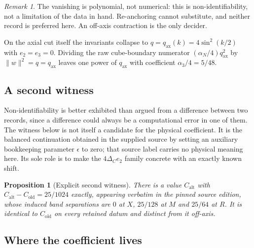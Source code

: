 \documentclass[11pt]{article}
\theoremstyle{plain}
\newtheorem{proposition}[theorem]{Proposition}
\theoremstyle{definition}
\theoremstyle{remark}
\newtheorem{remark}[theorem]{Remark}
\newcommand{\chk}[1]{}
\begin{document}
\begin{remark}
The vanishing is polynomial, not numerical: this is non-identifiability, not a
limitation of the data in hand. Re-anchoring cannot substitute, and neither
record is preferred here. An off-axis contraction is the only decider.
\chk{the crosswalk is exactly scalar on the momentum axes}
\end{remark}

On the axial cut itself the invariants collapse to
$q=q_{\mathrm{ax}}(k)=4\sin^2(k/2)$ with $e_2=e_3=0$. Dividing the raw
cube-boundary numerator $(\alpha_N/4)q_{\mathrm{ax}}^2$ by
$\|w\|^2=q=q_{\mathrm{ax}}$ leaves one power of $q_{\mathrm{ax}}$ with
coefficient $\alpha_3/4=5/48$.
\chk{on an axial cut the mixed invariants vanish and the norm divides}

\subsection{A second witness}

Non-identifiability is better exhibited than argued from a difference between
two records, since a difference could always be a computational error in one of
them. The witness below is not itself a candidate for the physical
coefficient. It is the balanced continuation obtained in the supplied source
by setting an auxiliary bookkeeping parameter $\epsilon$ to zero; that source
label carries no physical meaning here. Its sole role is to make the
$4\Delta_Ce_2$ family concrete with an exactly known shift.

\begin{proposition}[Explicit second witness]\label{prop:witness}
There is a value $C_{\mathrm{alt}}$ with
$C_{\mathrm{alt}}-C_{\mathrm{old}}=25/1024$ exactly, appearing verbatim in the
pinned source edition, whose induced band separations are $0$ at $X$,
$25/128$ at $M$ and $25/64$ at $R$. It is identical to
$C_{\mathrm{old}}$ on every retained datum and distinct from it off-axis.
\end{proposition}
\chk{FINDING: an explicit second witness C\_alt exhibits the C2 non-identifiability}
\chk{the C\_alt witness IS the balanced eps-free continuation, and Delta\_C/(A/2) = 15/32}

\subsection{Where the coefficient lives}
\end{document}
